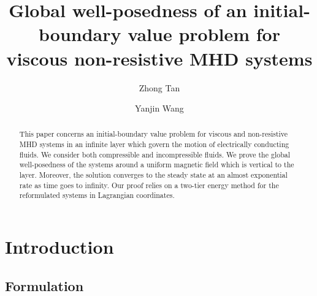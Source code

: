 \documentclass[a4paper,reqno,11pt]{amsart}
\title[Viscous non-resistive MHD systems]{Global well-posedness of an initial-boundary value problem for viscous non-resistive MHD systems}
\author{Zhong Tan}
\author{Yanjin Wang}
\numberwithin{equation}{section}
\begin{document}
\begin{abstract}
This paper concerns an initial-boundary value problem for viscous and non-resistive MHD systems in an infinite layer which govern the motion of electrically conducting fluids. We consider both compressible and incompressible fluids. We prove the global well-posedness of the systems around a uniform magnetic field which is vertical to the layer. Moreover, the solution converges to the steady state at an almost exponential rate as time goes to infinity. Our proof relies on a two-tier energy method for the reformulated systems in Lagrangian coordinates.
\end{abstract}

\maketitle

\section{Introduction}

\subsection{Formulation}
\end{document}
